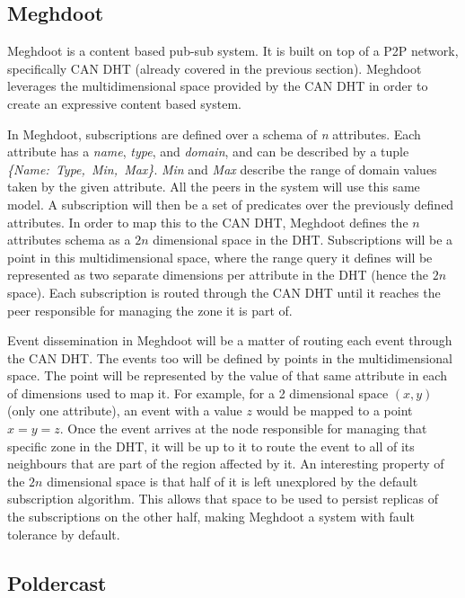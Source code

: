 \subsection{Meghdoot}\label{meghdoot}

Meghdoot \cite{Gupta2004} is a content based pub-sub system.
It is built on top of a P2P network, specifically CAN DHT (already
covered in the previous section). Meghdoot leverages the
multidimensional space provided by the CAN DHT in order to create an
expressive content based system.

In Meghdoot, subscriptions are defined over a schema of \emph{n}
attributes. Each attribute has a \emph{name}, \emph{type}, and
\emph{domain}, and can be described by a tuple
\emph{\{Name:\ Type,\ Min,\ Max\}}. \emph{Min} and \emph{Max} describe
the range of domain values taken by the given attribute. All the peers
in the system will use this same model. A subscription will then be a
set of predicates over the previously defined attributes. In order to
map this to the CAN DHT, Meghdoot defines the $n$ attributes schema
as a $2n$ dimensional space in the DHT. Subscriptions will be a
point in this multidimensional space, where the range query it defines
will be represented as two separate dimensions per attribute in the DHT
(hence the $2n$ space). Each subscription is routed through the CAN
DHT until it reaches the peer responsible for managing the zone it is
part of.

Event dissemination in Meghdoot will be a matter of routing each event
through the CAN DHT. The events too will be defined by points in the
multidimensional space. The point will be represented by the value of
that same attribute in each of dimensions used to map it. For example,
for a 2 dimensional space $(x,y)$ (only one attribute), an event
with a value $z$ would be mapped to a point $x=y=z$. Once the
event arrives at the node responsible for managing that specific zone in
the DHT, it will be up to it to route the event to all of its neighbours
that are part of the region affected by it. An interesting property of
the $2n$ dimensional space is that half of it is left unexplored by
the default subscription algorithm. This allows that space to be used to persist
replicas of the subscriptions on the other half, making Meghdoot a
system with fault tolerance by default.

\subsection{Poldercast}\label{poldercast}

